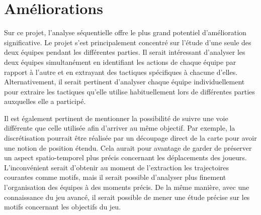 \section{Améliorations}
Sur ce projet, l'analyse séquentielle offre le plus grand potentiel d'amélioration significative. Le projet s'est principalement concentré sur l'étude d'une seule des deux équipes pendant les différentes parties. Il serait intéressant d'analyser les deux équipes simultanément en identifiant les actions de chaque équipe par rapport à l'autre et en extrayant des tactiques spécifiques à chacune d'elles. Alternativement, il serait pertinent d'analyser chaque équipe individuellement pour extraire les tactiques qu'elle utilise habituellement lors de différentes parties auxquelles elle a participé.

Il est également pertinent de mentionner la possibilité de suivre une voie différente que celle utilisée afin d'arriver au même objectif. Par exemple, la discrétisation pourrait être réalisée par un découpage direct de la carte pour avoir une notion de position étendu. Cela aurait pour avantage de garder de préserver un aspect spatio-temporel plus précis concernant les déplacements des joueurs. L'inconvénient serait d'obtenir au moment de l'extraction les trajectoires courantes comme motifs, mais il serait possible d'analyser plus finement l'organisation des équipes à des moments précis.
De la même manière, avec une connaissance du jeu avancé, il serait possible de mener une étude précise sur les motifs concernant les objectifs du jeu.

